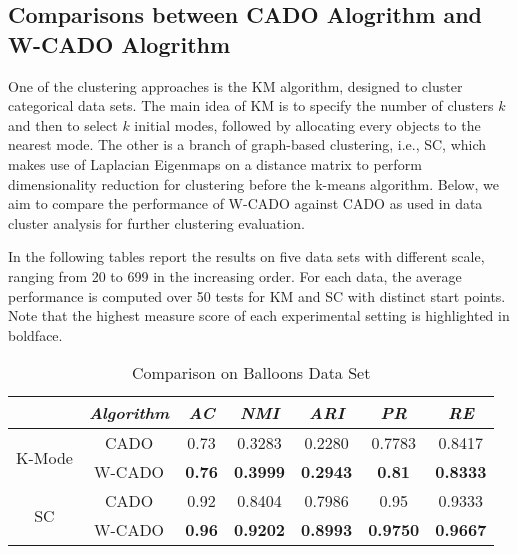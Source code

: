 \documentclass[review]{elsarticle}
\begin{document}
\subsection{Comparisons between CADO Alogrithm and W-CADO Alogrithm}
One of the clustering approaches is the KM algorithm, designed to cluster categorical data sets. The main idea of KM is to specify the number of clusters $k$ and then to select $k$ initial modes, followed by allocating every objects to the nearest mode. The other is a branch of graph-based clustering, i.e., SC, which makes use of Laplacian Eigenmaps on a distance matrix to perform dimensionality reduction for clustering before the k-means algorithm. Below, we aim to compare the performance of W-CADO against CADO as used in data cluster analysis for further clustering evaluation.

In the following tables report the results on five data sets with different scale, ranging from 20 to 699 in the increasing order. For each data, the average performance is computed over 50 tests for KM and SC with distinct start points. Note that the highest measure score of each experimental setting is highlighted in boldface.

\begin{table}[!h]\tabcolsep=0.065in
\centering
\caption{Comparison on Balloons Data Set}
\small
\label{tab:Comparison on Balloons Data Set}
\begin{tabular}{c|c|c|c|c|c|c}
\hline
\emph{}&\emph{Algorithm}&\emph{AC}&\emph{NMI}&\emph{ARI}&\emph{PR}&\emph{RE} \\
\hline
\multirow{2}{*}{K-Mode} & CADO & 0.73 & 0.3283 & 0.2280 & 0.7783 & 0.8417\\
    \cline{2-7}
    & W-CADO & \textbf{0.76} & \textbf{0.3999} & \textbf{0.2943} & \textbf{0.81} & \textbf{0.8333}\\
    \hline
\multirow{2}{*}{SC} & CADO & 0.92 & 0.8404 & 0.7986 & 0.95 & 0.9333\\
    \cline{2-7}
    & W-CADO & \textbf{0.96} & \textbf{0.9202} & \textbf{0.8993} & \textbf{0.9750} & \textbf{0.9667}\\
\hline
\end{tabular}
\end{table}
\end{document}
